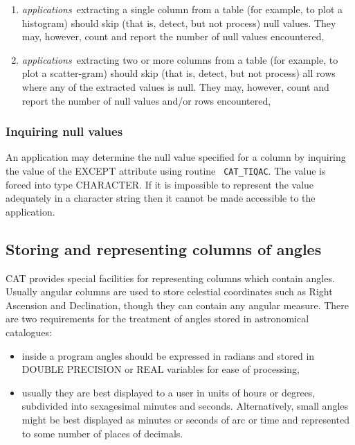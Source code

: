 \begin{enumerate}

  \item {\it applications}\, extracting a single column from a table 
   (for example, to plot a histogram) should skip (that is, detect, but 
   not process) null values. They may, however, count and report the 
   number of null values encountered,

  \item {\it applications}\, extracting two or more columns from a 
   table (for example, to plot a scatter-gram) should skip (that is, 
   detect, but not process) all rows where any of the extracted values 
   is null. They may, however, count and report the number of null 
   values and/or rows encountered,


\end{enumerate}

\subsubsection{Inquiring null values}

An application may determine the null value specified for a column by
inquiring the value of the EXCEPT attribute using routine {\tt
CAT\_TIQAC}. The value is forced into type CHARACTER. If it is 
impossible to represent the value adequately in a character string then
it cannot be made accessible to the application.


\subsection{\label{ANGLES}Storing and representing columns of angles}

CAT provides special facilities for representing columns which 
contain angles. Usually angular columns are used to store celestial
coordinates such as Right Ascension and Declination, though they can
contain any angular measure. There are two requirements for the treatment
of angles stored in astronomical catalogues:

\begin{itemize}

  \item inside a program angles should be expressed in radians 
   and stored in DOUBLE PRECISION or REAL variables for ease of 
   processing,

  \item usually they are best displayed to a user in units of hours 
   or degrees, subdivided into sexagesimal minutes and seconds.
   Alternatively, small angles might be best displayed as minutes or
   seconds of arc or time and represented to some number of places of
   decimals.

\end{itemize}

